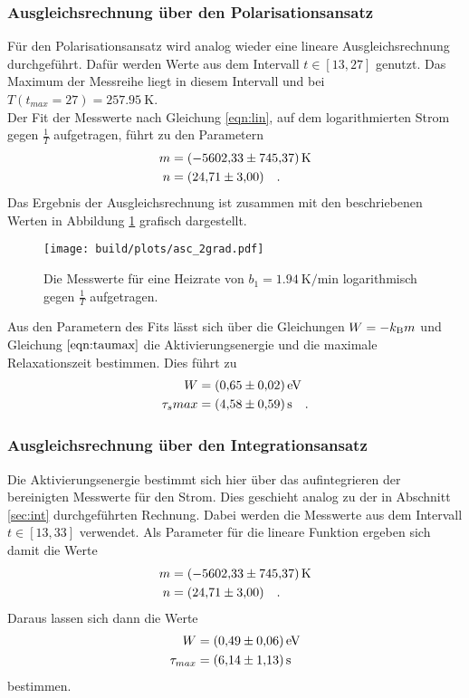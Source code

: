 \subsubsection{Ausgleichsrechnung über den Polarisationsansatz}

\noindent
Für den Polarisationsansatz wird analog wieder eine lineare Ausgleichsrechnung durchgeführt.
Dafür werden Werte aus dem Intervall $t \in [13,27]$ genutzt.
Das Maximum der Messreihe liegt in diesem Intervall und bei $T(t_{max} = 27) = \SI{257.95}{\kelvin}$. \\
Der Fit der Messwerte nach Gleichung \ref{eqn:lin}, auf dem logarithmierten Strom gegen $\frac{1}{T}$ aufgetragen, führt zu den Parametern
\begin{align*}
  m & = \SI{ -5602.33( 74537)}{\kelvin}\\
  n & = \SI{24.71(300)}{} \quad .
\end{align*}
Das Ergebnis der Ausgleichsrechnung ist zusammen mit den beschriebenen Werten in Abbildung \ref{img:pol2} grafisch dargestellt.

\begin{figure}[ht]
  \centering
  \texttt{[image: build/plots/asc\_2grad.pdf]}
  \caption{Die Messwerte für eine Heizrate von $b_1 = \SI{1.94}{\kelvin\per\minute}$ 
          logarithmisch gegen $\frac{1}{T}$ aufgetragen.}
  \label{img:pol2}
\end{figure}

\noindent
Aus den Parametern des Fits lässt sich über die Gleichungen $W = -k_{\text{B}} m$ und Gleichung $\ref{eqn:taumax}$ die Aktivierungsenergie und die maximale Relaxationszeit bestimmen.
Dies führt zu 
\begin{align*}
  W &= \SI{0.65 (002)}{\electronvolt}\\
  \tau_s{max} &= \SI{4.58 (059)}{\second} \quad .
\end{align*}



\subsubsection{Ausgleichsrechnung über den Integrationsansatz}

\noindent
Die Aktivierungsenergie bestimmt sich hier über das aufintegrieren der bereinigten Messwerte für den Strom. 
Dies geschieht analog zu der in Abschnitt \ref{sec:int} durchgeführten Rechnung.
Dabei werden die Messwerte aus dem Intervall  $t \in [13,33]$ verwendet.
Als Parameter für die lineare Funktion ergeben sich damit die Werte
\begin{align*}
  m & = \SI{  -5602.33 (74537)}{\kelvin}\\
  n & = \SI{24.71 (300)}{} \quad .
\end{align*}
Daraus lassen sich dann die Werte 
\begin{align*}
  W &= \SI{ 0.49  (006)}{\electronvolt}\\
  \tau_{max} &= \SI{6.14 (113)}{\second}
\end{align*}
bestimmen.




